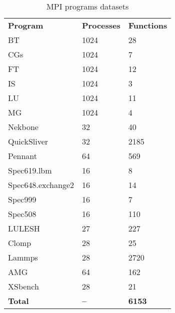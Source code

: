 \documentclass[lineno,sn-mathphys]{sn-jnl}%
\theoremstyle{thmstyleone}%
\theoremstyle{thmstyletwo}%
\theoremstyle{thmstylethree}%
\begin{document}
 \begin{table*}[ht]
     \centering
     \caption{MPI programs datasets}
     \label{tab:data}
     \begin{tabular}{@{}lll@{}}
     \hline
     \textbf{Program}      & \textbf{Processes} & \textbf{Functions} \\ 
     BT                    & 1024                                           & 28                           \\
     CGs                   & 1024                                           & 7                            \\
     FT                    & 1024                                           & 12                           \\
     IS                    & 1024                                           & 3                            \\
     LU                    & 1024                                           & 11                           \\  
     MG                    & 1024                                           & 4                            \\  
     Nekbone               & 32                                             & 40                           \\  
     QuickSliver           & 32                                             & 2185                         \\  
     Pennant               & 64                                             & 569                          \\ 
     Spec619.lbm           & 16                                             & 8                            \\ 
     Spec648.exchange2     & 16                                             & 14                           \\ 
     Spec999               & 16                                             & 7                            \\ 
     Spec508               & 16                                             & 110                          \\  
     LULESH                & 27                                             & 227                          \\  
     Clomp                 & 28                                             & 25                           \\ 
     Lammps                & 28                                             & 2720                         \\  
     AMG                   & 64                                             & 162                          \\ 
     XSbench               & 28                                             & 21                           \\  
     \textbf{Total}        & \textbf{--}                                    & \textbf{6153}                \\  
     \hline
     \end{tabular}
 \end{table*}\par
\end{document}
